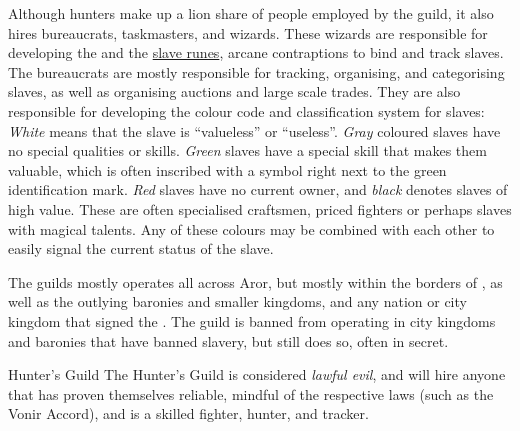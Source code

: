 Although hunters make up a lion share of people employed by the guild, it also
hires bureaucrats, taskmasters, and wizards. These wizards are responsible for
developing the  and the \hyperref[sec:Slave Mark]{slave
  runes}, arcane contraptions to bind and track slaves. The bureaucrats are
mostly responsible for tracking, organising, and categorising slaves, as well
as organising auctions and large scale trades. They are also responsible for
developing the colour code and classification system for slaves: \emph{White}
means that the slave is ``valueless'' or ``useless''. \emph{Gray} coloured
slaves have no special qualities or skills. \emph{Green} slaves have a special
skill that makes them valuable, which is often inscribed with a symbol right
next to the green identification mark. \emph{Red} slaves have no current
owner, and \emph{black} denotes slaves of high value. These are often
specialised craftsmen, priced fighters or perhaps slaves with magical
talents. Any of these colours may be combined with each other to easily signal
the current status of the slave.

The guilds mostly operates all across Aror, but mostly within the borders of
, as well as the outlying baronies and smaller kingdoms,
and any nation or city kingdom that signed the . The
guild is banned from operating in city kingdoms and baronies that have banned
slavery, but still does so, often in secret.

\begin{35e}{Hunter's Guild}
  The Hunter's Guild is considered \emph{lawful evil}, and will hire anyone
  that has proven themselves reliable, mindful of the respective laws (such as
  the Vonir Accord), and is a skilled fighter, hunter, and tracker.
\end{35e}
